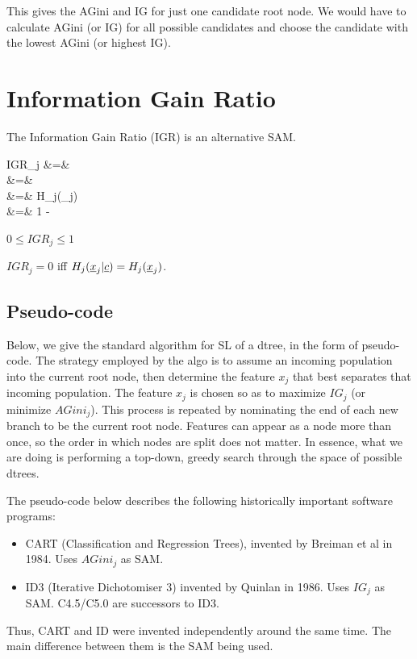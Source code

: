 This gives
the AGini and IG for just one 
candidate root node.
We would have
to calculate
AGini (or IG) for all
possible candidates
and choose the candidate
with the lowest AGini (or highest IG).


\section{Information Gain Ratio}

The Information Gain Ratio (IGR) is an alternative SAM.

\beqa
IGR_j
&=&
\\
&=&
\\
&=&
{H_j(\rvx_j)}
\\
&=&
1 -\;
\eeqa

$0\leq IGR_j\leq 1$

$IGR_j=0$ iff $H_j(\rvx_j |\rvc)=H_j(\rvx_j)$.




\subsection{Pseudo-code}

Below,
we give the standard
algorithm for SL
of a dtree, in the form
of pseudo-code.
The strategy
employed by
the algo
is to assume an incoming
population into the current root node,
then
determine the feature $x_j$
 that best separates that 
incoming
population. The feature
$x_j$ is chosen so as to maximize
$IG_j$
(or minimize $AGini_j$). This
process is repeated by nominating
the end of each new branch to be
the current root node.
Features can appear as a node 
more than once, so the order in 
which nodes are split does not matter.
In essence, what we are doing is
performing a top-down, greedy search
through the space of possible dtrees.

The pseudo-code below describes the following 
historically important
software programs:
\begin{itemize}
\item CART (Classification and Regression Trees),
invented by Breiman et al in 1984. Uses $AGini_j$ as SAM.
\item
ID3 (Iterative Dichotomiser 3)
invented by Quinlan in 1986. Uses $IG_j$ as SAM.
C4.5/C5.0 are successors to ID3.
\end{itemize}

Thus, CART and ID were 
invented independently around the same time.
The main difference between them is the SAM
being used.



